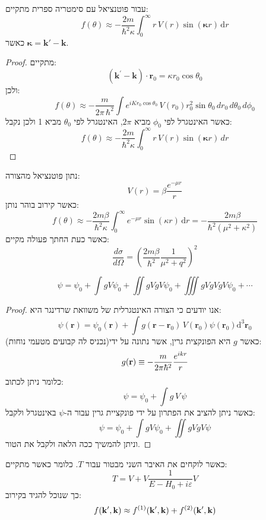 \documentclass{tstextbook}
\begin{document}
\begin{corollary}
עבור פוטנציאל עם סימטריה ספרית מתקיים:
$$f\left( \theta \right)\approx-\frac{2m}{\hbar^{2}\kappa}\int_{0}^{\infty}r\,V(r)\sin\left( \boldsymbol\kappa r \right)\,\mathrm{d} r$$
כאשר \({} \boldsymbol \kappa = \mathbf{k'}-\mathbf{k}\).

\end{corollary}
\begin{proof}
מתקיים:
$$\left(\mathbf{k}^{\prime}-\mathbf{k}\right)\cdot\mathbf{r}_{0}=\kappa r_{0}\cos\theta_{0}$$
ולכן:
$$f(\theta)\approx-\frac{m}{2\pi\,\hbar^{2}}\int e^{i K r_{0}\cos\theta_{0}}\,V(r_{0})r_{0}^{2}\sin\theta_{0}\,d r_{0}\,d\theta_{0}\,d\phi_{0}$$
כאשר האינטגרל לפי \(\phi_{0}\) מביא \(2\pi\), האינטגרל לפי \(\theta_{0}\) מביא 1 ולכן נקבל:
$$f(\theta)\approx-\frac{2m}{\hbar^{2}\kappa}\int_{0}^{\infty}r\,V(r)\sin(\boldsymbol\kappa r)\,d r$$

\end{proof}
\begin{example}
נתון פוטנציאל מהצורה:
$$V(r)=\beta{\frac{e^{-\mu r}}{r}}$$
כאשר קירוב בוהר נותן:
$$f\left( \theta \right)\approx-\frac{2m\beta}{\hbar^{2}\kappa}\int_{0}^{\infty}e^{-\mu r}\sin\left( \kappa r \right)\,\mathrm{d} r=-\frac{2m\beta}{\hbar^{2}\left(\mu^{2}+\kappa^{2}\right)}$$
כאשר כעת החתך פעולה מקיים:
$$\frac{d\sigma}{d\Omega}=\left(\frac{2m\beta}{\hbar^{2}}\frac{1}{\mu^{2}+q^{2}}\right)^{2}$$

\end{example}
\begin{proposition}
$$\psi=\psi_{0}+\int g V\psi_{0}+\iint g V g V\psi_{0}+\iiint g V g V g V\psi_{0}+\cdots$$

\end{proposition}
\begin{proof}
אנו יודעים כי הצורה האינטגרלית של משוואת שרדינגר היא:
$$\psi\left(\mathbf{r}\right)=\psi_{0}\left( \mathbf{r} \right)+\int g\left( \mathbf{r}-\mathbf{r}_{0} \right)\,V\left( \mathbf{r}_{0} \right)\psi\left(\mathbf{r}_{0}\right)\mathrm{d}^{3}\mathbf{r}_{0}$$
כאשר \(g\) היא הפונקצית גרין, אשר נתונה על ידי(נכניס לה קבועים מטעמי נוחות):
$$g({\bf r})\equiv-\frac{m}{2\pi\hbar^{2}}\frac{e^{i k r}}{r}$$
כלומר ניתן לכתוב:
$$\psi=\psi_{0}+\int g\,V\,\psi$$
כאשר ניתן להציב את הפתרון על ידי פונקציית גרין עבור ה-\(\psi\) באינטגרל ולקבל:
$$\psi=\psi_{0}+\int g V\psi_{0}+\iint g V g V\psi$$
וניתן להמשיך ככה הלאה ולקבל את הטור.

\end{proof}
\begin{definition}
כאשר לוקחים את האיבר השני מבטור עבור \(T\). כלומר כאשר מתקיים:
$$T=V+V\frac{1}{E-H_{0}+i\varepsilon}V$$
כך שנוכל להגיד בקירוב:
$$f({\bf k^{\prime},k})\approx f^{(1)}({\bf k^{\prime},k})+f^{(2)}({\bf k^{\prime},k})$$

\end{definition}
\end{document}
